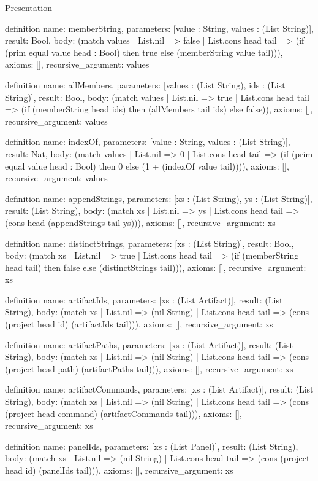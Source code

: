 \begin{lexlean}{Presentation}
\begin{semanticmodule}
definition{
  name: memberString,
  parameters: [value : String, values : (List String)],
  result: Bool,
  body: (match values
    | List.nil => false
    | List.cons head tail => (if (prim equal value head : Bool) then true else (memberString value tail))),
  axioms: [],
  recursive_argument: values
}

definition{
  name: allMembers,
  parameters: [values : (List String), ids : (List String)],
  result: Bool,
  body: (match values
    | List.nil => true
    | List.cons head tail => (if (memberString head ids) then (allMembers tail ids) else false)),
  axioms: [],
  recursive_argument: values
}

definition{
  name: indexOf,
  parameters: [value : String, values : (List String)],
  result: Nat,
  body: (match values
    | List.nil => 0
    | List.cons head tail => (if (prim equal value head : Bool) then 0 else (1 + (indexOf value tail)))),
  axioms: [],
  recursive_argument: values
}

definition{
  name: appendStrings,
  parameters: [xs : (List String), ys : (List String)],
  result: (List String),
  body: (match xs
    | List.nil => ys
    | List.cons head tail => (cons head (appendStrings tail ys))),
  axioms: [],
  recursive_argument: xs
}

definition{
  name: distinctStrings,
  parameters: [xs : (List String)],
  result: Bool,
  body: (match xs
    | List.nil => true
    | List.cons head tail => (if (memberString head tail) then false else (distinctStrings tail))),
  axioms: [],
  recursive_argument: xs
}

definition{
  name: artifactIds,
  parameters: [xs : (List Artifact)],
  result: (List String),
  body: (match xs
    | List.nil => (nil String)
    | List.cons head tail => (cons (project head id) (artifactIds tail))),
  axioms: [],
  recursive_argument: xs
}

definition{
  name: artifactPaths,
  parameters: [xs : (List Artifact)],
  result: (List String),
  body: (match xs
    | List.nil => (nil String)
    | List.cons head tail => (cons (project head path) (artifactPaths tail))),
  axioms: [],
  recursive_argument: xs
}

definition{
  name: artifactCommands,
  parameters: [xs : (List Artifact)],
  result: (List String),
  body: (match xs
    | List.nil => (nil String)
    | List.cons head tail => (cons (project head command) (artifactCommands tail))),
  axioms: [],
  recursive_argument: xs
}

definition{
  name: panelIds,
  parameters: [xs : (List Panel)],
  result: (List String),
  body: (match xs
    | List.nil => (nil String)
    | List.cons head tail => (cons (project head id) (panelIds tail))),
  axioms: [],
  recursive_argument: xs
}


\end{semanticmodule}
\end{lexlean}
